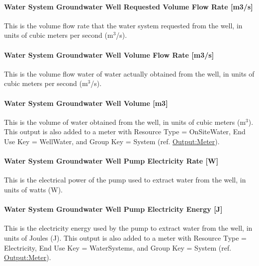\paragraph{Water System Groundwater Well Requested Volume Flow Rate {[}m3/s{]}}\label{water-system-groundwater-well-requested-volume-flow-rate-m3s}

This is the volume flow rate that the water system requested from the well, in units of cubic meters per second (m\(^{3}\)/s).

\paragraph{Water System Groundwater Well Volume Flow Rate {[}m3/s{]}}\label{water-system-groundwater-well-volume-flow-rate-m3s}

This is the volume flow water of water actually obtained from the well, in units of cubic meters per second (m\(^{3}\)/s).

\paragraph{Water System Groundwater Well Volume {[}m3{]}}\label{water-system-groundwater-well-volume-m3}

This is the volume of water obtained from the well, in units of cubic meters (m\(^{3}\)). This output is also added to a meter with Resource Type = OnSiteWater, End Use Key = WellWater, and Group Key = System (ref. \hyperref[outputmeter-and-outputmetermeterfileonly]{Output:Meter}).

\paragraph{Water System Groundwater Well Pump Electricity Rate {[}W{]}}\label{water-system-groundwater-well-pump-electric-power-w}

This is the electrical power of the pump used to extract water from the well, in units of watts (W).

\paragraph{Water System Groundwater Well Pump Electricity Energy {[}J{]}}\label{water-system-groundwater-well-pump-electric-energy-j}

This is the electricity energy used by the pump to extract water from the well, in units of Joules (J). This output is also added to a meter with Resource Type = Electricity, End Use Key = WaterSystems, and Group Key = System (ref. \hyperref[outputmeter-and-outputmetermeterfileonly]{Output:Meter}).
